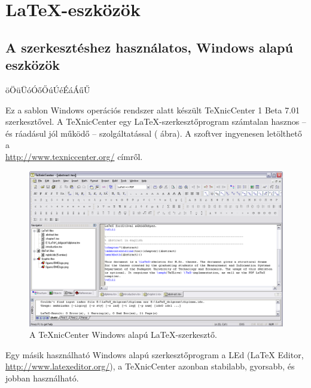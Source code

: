 \chapter{\LaTeX-eszközök}\label{sect:LatexTools}
\section{A szerkesztéshez használatos, Windows alapú eszközök}

öÖüÜóÓőŐúÚéÉáÁűŰ

Ez a sablon Windows operációs rendszer alatt készült TeXnicCenter 1 Beta 7.01 szerkesztővel. A TeXnicCenter egy \LaTeX-szerkesztőprogram számtalan hasznos -- és ráadásul jól működő -- szolgáltatással ( ábra). A szoftver ingyenesen letölthető a\\\url{http://www.texniccenter.org/} címről.

\begin{figure}[!ht]
\centering
\includegraphics[width=150mm, keepaspectratio]{figures/TeXnicCenter.png}
\caption{A TeXnicCenter Windows alapú \LaTeX-szerkesztő.} 
\label{fig:TexnicCenter}
\end{figure}

Egy másik használható Windows alapú szerkesztőprogram a LEd (LaTeX Editor,\\\url{http://www.latexeditor.org/}), a TeXnicCenter azonban stabilabb, gyorsabb, és jobban használható.

